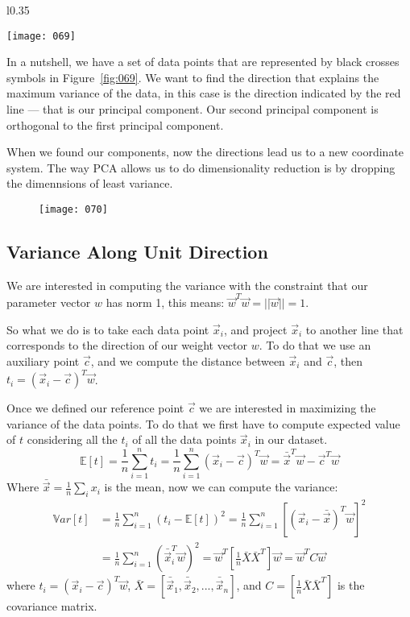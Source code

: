 \begin{wrapfigure}{l}{0.35\textwidth}
    \begin{center}
        \texttt{[image: 069]}
        \caption{}
    \end{center}
    \label{fig:069}
\end{wrapfigure}
In a nutshell, we have a set of data points that are represented by black crosses symbols in Figure~\ref{fig:069}. We want to find the direction that explains the maximum variance of the data, in this case is the direction indicated by the red line --- that is our principal component. Our second principal component is orthogonal to the first principal component.

When we found our components, now the directions lead us to a new coordinate system. The way PCA allows us to do dimensionality reduction is by dropping the dimennsions of least variance.
\begin{figure}[h!]
    \centering
    \texttt{[image: 070]}
    \caption{}
    \label{fig:070}
\end{figure}

\subsection{Variance Along Unit Direction}
We are interested in computing the variance with the constraint that our parameter vector \(w\) has norm 1, this means: \(\vec{w}^T\vec{w} = ||\vec{w}|| = 1\). 

So what we do is to take each data point \(\vec{x}_i\), and project \(\vec{x}_i\) to another line that corresponds to the direction of our weight vector \(w\). To do that we use an auxiliary point \(\vec{c}\), and we compute the distance between \(\vec{x}_i\) and \(\vec{c}\), then \(t_i = (\vec{x}_i - \vec{c})^T \vec{w}\).

Once we defined our reference point \(\vec{c}\) we are interested in maximizing the variance of the data points. To do that we first have to compute expected value of \(t\) considering all the \(t_i\) of all the data points \(\vec{x}_i\) in our dataset.
\begin{equation}
    \mathbb{E}\left[t\right] = \frac 1 n \sum_{i=1}^n t_i = \frac 1 n \sum_{i=1}^n (\vec{x}_i - \vec{c})^T \vec{w} = \bar{\vec{x}}^T \vec{w} - \vec{c}^T \vec{w}
\end{equation}
Where \(\bar{\vec{x}} = \frac 1 n \sum_i x_i\) is the mean, now we can compute the variance:
\begin{align}
    \mathbb{V}ar\left[t\right] &= \frac 1 n \sum_{i=1}^n \left(t_i - \mathbb{E}[t]\right)^2 = \frac 1 n \sum_{i=1}^n \left[(\vec{x}_i - \bar{\vec{x}})^T \vec{w}\right]^2\\
    & = \frac 1 n \sum_{i=1}^n \left(\bar{\vec{x}}_i^T \vec{w}\right)^2 = \vec{w}^T \left[ \frac 1 n \bar{X}\bar{X}^T \right] \vec{w} = \vec{w}^T C \vec{w}
\end{align}
where \(t_i = (\vec{x}_i - \vec{c})^T \vec{w}\), \(\bar{X} = [\bar{\vec{x}}_1, \bar{\vec{x}}_2, ..., \bar{\vec{x}}_n]\), and \(C = \left[ \frac 1 n \bar{X}\bar{X}^T \right]\) is the covariance matrix.

